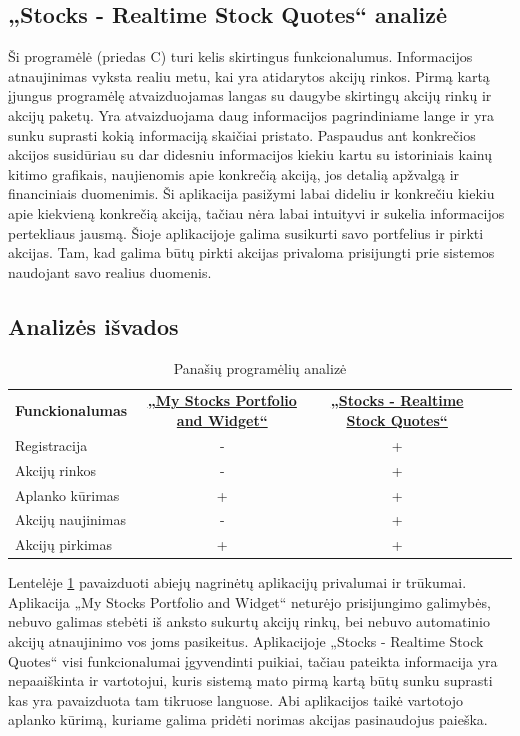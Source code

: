 \documentclass[a4paper,12pt,fleqn]{article}
\begin{document}
\subsection{„Stocks - Realtime Stock Quotes“ analizė}
Ši programėlė (priedas C) turi kelis skirtingus funkcionalumus.
Informacijos atnaujinimas vyksta realiu metu, kai yra atidarytos akcijų rinkos. Pirmą kartą įjungus programėlę atvaizduojamas langas su daugybe skirtingų akcijų rinkų ir akcijų paketų. Yra atvaizduojama daug informacijos pagrindiniame lange ir yra sunku suprasti kokią informaciją skaičiai pristato. Paspaudus ant konkrečios akcijos susidūriau su dar didesniu informacijos kiekiu kartu su istoriniais kainų kitimo grafikais, naujienomis apie konkrečią akciją, jos detalią apžvalgą ir financiniais duomenimis. Ši aplikacija pasižymi labai dideliu ir konkrečiu kiekiu apie kiekvieną konkrečią akciją, tačiau nėra labai intuityvi ir sukelia informacijos pertekliaus jausmą. Šioje aplikacijoje galima susikurti savo portfelius ir pirkti akcijas. Tam, kad galima būtų pirkti akcijas privaloma prisijungti prie sistemos naudojant savo realius duomenis.
\subsection{Analizės išvados}
\begin{table}[!ht]\centering
	\begin{tabular}{|l|c|c|ll}
		\cline{1-3}
		\textbf{Funckionalumas} & \textbf{\href{https://play.google.com/store/apps/details?id=co.peeksoft.stocks}{„My Stocks Portfolio and Widget“}} & \textbf{\href{https://play.google.com/store/apps/details?id=org.dayup.stocks}{„Stocks - Realtime Stock Quotes“}} &  \\ \cline{1-3}
		Registracija&-&+& \\ \cline{1-3}
		Akcijų rinkos&-&+& \\ \cline{1-3}
		Aplanko kūrimas&+&+& \\ \cline{1-3}
		Akcijų naujinimas&-&+& \\ \cline{1-3}
		Akcijų pirkimas&+&+& \\ \cline{1-3}
	\end{tabular}
	\caption{Panašių programėlių analizė}
	\label{tabl:isvadu-lentele}
\end{table}
Lentelėje \ref{tabl:isvadu-lentele} pavaizduoti abiejų nagrinėtų aplikacijų privalumai ir trūkumai. Aplikacija „My Stocks Portfolio and Widget“ neturėjo prisijungimo galimybės, nebuvo galimas stebėti iš anksto sukurtų akcijų rinkų, bei nebuvo automatinio akcijų atnaujinimo vos joms pasikeitus. Aplikacijoje „Stocks - Realtime Stock Quotes“ visi funkcionalumai įgyvendinti puikiai, tačiau pateikta informacija yra nepaaiškinta ir vartotojui, kuris sistemą mato pirmą kartą būtų sunku suprasti kas yra pavaizduota tam tikruose languose. Abi aplikacijos taikė vartotojo aplanko kūrimą, kuriame galima pridėti norimas akcijas pasinaudojus paieška.
 
\end{document}
